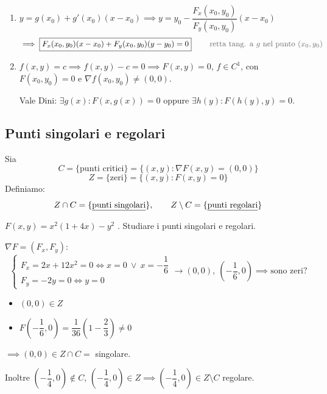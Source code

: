 \begin{oss}
\begin{enumerate}
    \item $y = g(x_0) + g'(x_0)(x - x_0) \implies y = y_0 - \dfrac{F_x(x_0, y_0)}{F_y(x_0, y_0)}(x - x_0)$ \quad {}
    \[
    \implies \boxed{F_x(x_0, y_0)(x - x_0) + F_y(x_0, y_0)(y - y_0) = 0} \qquad \text{\pencilnote{retta tang. a $g$ nel punto $(x_0, y_0)$}}
    \]
    \item $f(x, y) = c \implies f(x, y) - c = 0 \implies F(x, y) = 0$, $f \in C^1$, con $F(x_0, y_0) = 0$ e $\nabla f(x_0, y_0) \neq (0, 0)$.

    Vale Dini: $\exists g(x) : F(x, g(x)) = 0$ oppure $\exists h(y) : F(h(y), y) = 0$.
\end{enumerate}
\end{oss}

\subsection{Punti singolari e regolari}

\begin{definition}
Sia
\[
C = \{ \text{punti critici} \} = \{ (x, y) : \nabla F(x, y) = (0, 0) \}
\]
\[
Z = \{ \text{zeri} \} = \{ (x, y) : F(x, y) = 0 \}
\]
Definiamo:
\[
Z \cap C = \{ \text{\underline{punti singolari}} \}, \qquad Z \setminus C = \{ \text{\underline{punti regolari}} \}
\]
\end{definition}

\begin{esercizio}[EXE]
$F(x, y) = x^2(1 + 4x) - y^2$ . Studiare i punti singolari e regolari.

$\nabla F = (F_x, F_y)$:
\[
\begin{cases}
F_x = 2x + 12x^2 = 0 \iff x = 0 \ \lor \ x = -\dfrac{1}{6} \\
F_y = -2y = 0 \iff y = 0
\end{cases}
\to (0, 0), \ \left(-\frac{1}{6}, 0\right) \implies \text{sono zeri?}
\]
\begin{itemize}
    \item $(0, 0) \in Z$
    \item $F\left(-\dfrac{1}{6}, 0\right) = \dfrac{1}{36}\left(1 - \dfrac{2}{3}\right) \neq 0$
\end{itemize}
$\implies (0, 0) \in Z \cap C =$ singolare.

Inoltre $\left(-\dfrac{1}{4}, 0\right) \notin C$, $\left(-\dfrac{1}{4}, 0\right) \in Z \implies \left(-\dfrac{1}{4}, 0\right) \in Z \setminus C$ regolare.
\end{esercizio}

